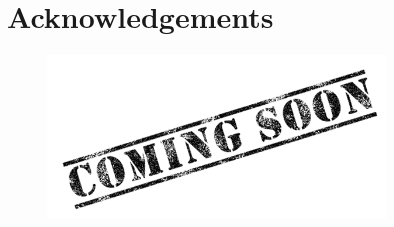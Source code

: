 %
\chapter*{Acknowledgements}
\label{sec:acknowledgement}
\vspace*{-10mm}

\bigskip
\bigskip
\bigskip

\begin{figure}[H]%
	\centering%
	\includegraphics[width=0.8\textwidth]{images/slickHolder.jpg}%
\end{figure}%


